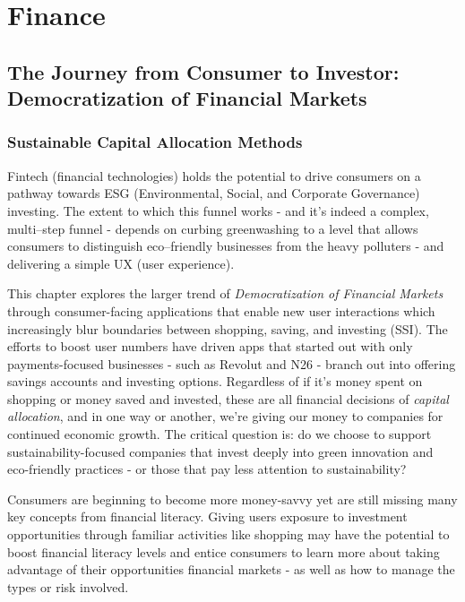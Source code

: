 \documentclass[
  letterpaper,
  DIV=11,
  numbers=noendperiod]{scrartcl}
\begin{document}
\newpage

\section{Finance}\label{finance}

\subsection{The Journey from Consumer to Investor: Democratization of
Financial
Markets}\label{the-journey-from-consumer-to-investor-democratization-of-financial-markets}

\subsubsection{Sustainable Capital Allocation
Methods}\label{sustainable-capital-allocation-methods}

Fintech (financial technologies) holds the potential to drive consumers
on a pathway towards ESG (Environmental, Social, and Corporate
Governance) investing. The extent to which this funnel works - and it's
indeed a complex, multi--step funnel - depends on curbing greenwashing
to a level that allows consumers to distinguish eco--friendly businesses
from the heavy polluters - and delivering a simple UX (user experience).

This chapter explores the larger trend of \emph{Democratization of
Financial Markets} through consumer-facing applications that enable new
user interactions which increasingly blur boundaries between shopping,
saving, and investing (SSI). The efforts to boost user numbers have
driven apps that started out with only payments-focused businesses -
such as Revolut and N26 - branch out into offering savings accounts and
investing options. Regardless of if it's money spent on shopping or
money saved and invested, these are all financial decisions of
\emph{capital allocation}, and in one way or another, we're giving our
money to companies for continued economic growth. The critical question
is: do we choose to support sustainability-focused companies that invest
deeply into green innovation and eco-friendly practices - or those that
pay less attention to sustainability?

Consumers are beginning to become more money-savvy yet are still missing
many key concepts from financial literacy. Giving users exposure to
investment opportunities through familiar activities like shopping may
have the potential to boost financial literacy levels and entice
consumers to learn more about taking advantage of their opportunities
financial markets - as well as how to manage the types or risk involved.
\end{document}
